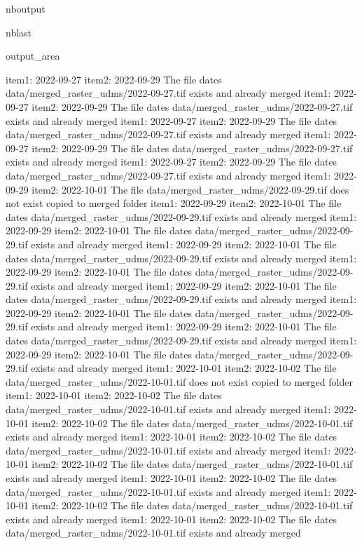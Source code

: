 \documentclass[letterpaper,10pt]{sphinxmanual}
\begin{document}
\begin{sphinxuseclass}{nboutput}
\begin{sphinxuseclass}{nblast}
{\begin{sphinxuseclass}{output_area}
\begin{sphinxuseclass}{}
\begin{sphinxVerbatim}[commandchars=\\\{\}]
item1:  2022-09-27
item2:  2022-09-29
The file dates data/merged\_raster\_udms/2022-09-27.tif exists and already merged
item1:  2022-09-27
item2:  2022-09-29
The file dates data/merged\_raster\_udms/2022-09-27.tif exists and already merged
item1:  2022-09-27
item2:  2022-09-29
The file dates data/merged\_raster\_udms/2022-09-27.tif exists and already merged
item1:  2022-09-27
item2:  2022-09-29
The file dates data/merged\_raster\_udms/2022-09-27.tif exists and already merged
item1:  2022-09-27
item2:  2022-09-29
The file dates data/merged\_raster\_udms/2022-09-27.tif exists and already merged
item1:  2022-09-29
item2:  2022-10-01
The file data/merged\_raster\_udms/2022-09-29.tif does not exist copied to merged folder
item1:  2022-09-29
item2:  2022-10-01
The file dates data/merged\_raster\_udms/2022-09-29.tif exists and already merged
item1:  2022-09-29
item2:  2022-10-01
The file dates data/merged\_raster\_udms/2022-09-29.tif exists and already merged
item1:  2022-09-29
item2:  2022-10-01
The file dates data/merged\_raster\_udms/2022-09-29.tif exists and already merged
item1:  2022-09-29
item2:  2022-10-01
The file dates data/merged\_raster\_udms/2022-09-29.tif exists and already merged
item1:  2022-09-29
item2:  2022-10-01
The file dates data/merged\_raster\_udms/2022-09-29.tif exists and already merged
item1:  2022-09-29
item2:  2022-10-01
The file dates data/merged\_raster\_udms/2022-09-29.tif exists and already merged
item1:  2022-09-29
item2:  2022-10-01
The file dates data/merged\_raster\_udms/2022-09-29.tif exists and already merged
item1:  2022-09-29
item2:  2022-10-01
The file dates data/merged\_raster\_udms/2022-09-29.tif exists and already merged
item1:  2022-10-01
item2:  2022-10-02
The file data/merged\_raster\_udms/2022-10-01.tif does not exist copied to merged folder
item1:  2022-10-01
item2:  2022-10-02
The file dates data/merged\_raster\_udms/2022-10-01.tif exists and already merged
item1:  2022-10-01
item2:  2022-10-02
The file dates data/merged\_raster\_udms/2022-10-01.tif exists and already merged
item1:  2022-10-01
item2:  2022-10-02
The file dates data/merged\_raster\_udms/2022-10-01.tif exists and already merged
item1:  2022-10-01
item2:  2022-10-02
The file dates data/merged\_raster\_udms/2022-10-01.tif exists and already merged
item1:  2022-10-01
item2:  2022-10-02
The file dates data/merged\_raster\_udms/2022-10-01.tif exists and already merged
item1:  2022-10-01
item2:  2022-10-02
The file dates data/merged\_raster\_udms/2022-10-01.tif exists and already merged
item1:  2022-10-01
item2:  2022-10-02
The file dates data/merged\_raster\_udms/2022-10-01.tif exists and already merged

\end{sphinxVerbatim}
\end{sphinxuseclass}
\end{sphinxuseclass}}
\end{sphinxuseclass}
\end{sphinxuseclass}
\end{document}

